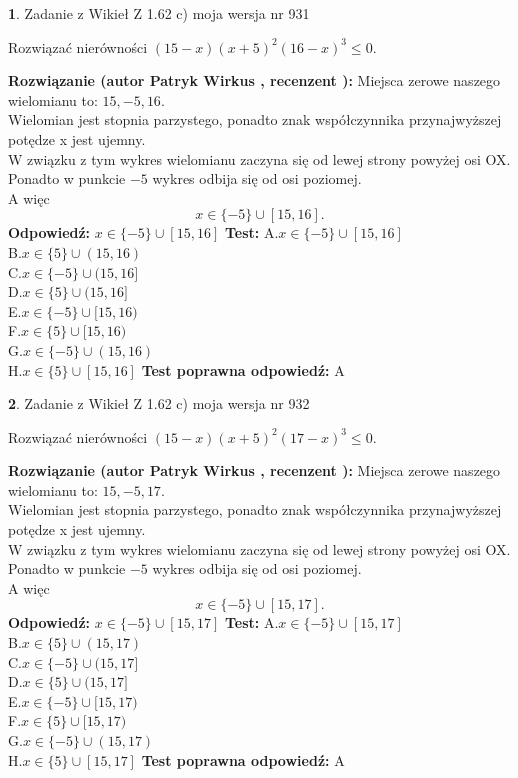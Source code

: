 \documentclass[12pt, a4paper]{article}
\theoremstyle{definition} %
\newtheorem{zad}{}
\newcommand{\zadStart}[1]{\begin{zad}#1\newline}
\newcommand{\zadStop}{\end{zad}}
\newcommand{\rozwStart}[2]{\noindent \textbf{Rozwiązanie (autor #1 , recenzent #2): }\newline}
\newcommand{\rozwStop}{\newline}
\newcommand{\odpStart}{\noindent \textbf{Odpowiedź:}\newline}
\newcommand{\odpStop}{\newline}
\newcommand{\testStart}{\noindent \textbf{Test:}\newline}
\newcommand{\testStop}{\newline}
\newcommand{\kluczStart}{\noindent \textbf{Test poprawna odpowiedź:}\newline}
\newcommand{\kluczStop}{\newline}
\begin{document}
\zadStart{Zadanie z Wikieł Z 1.62 c) moja wersja nr 931}

Rozwiązać nierówności $(15-x)(x+5)^{2}(16-x)^{3}\le0$.
\zadStop
\rozwStart{Patryk Wirkus}{}
Miejsca zerowe naszego wielomianu to: $15, -5, 16$.\\
Wielomian jest stopnia parzystego, ponadto znak współczynnika przy\linebreak najwyższej potędze x jest ujemny.\\ W związku z tym wykres wielomianu zaczyna się od lewej strony powyżej osi OX.\\
Ponadto w punkcie $-5$ wykres odbija się od osi poziomej.\\
A więc $$x \in \{-5\} \cup [15,16].$$
\rozwStop
\odpStart
$x \in \{-5\} \cup [15,16]$
\odpStop
\testStart
A.$x \in \{-5\} \cup [15,16]$\\
B.$x \in \{5\} \cup (15,16)$\\
C.$x \in \{-5\} \cup (15,16]$\\
D.$x \in \{5\} \cup (15,16]$\\
E.$x \in \{-5\} \cup [15,16)$\\
F.$x \in \{5\} \cup [15,16)$\\
G.$x \in \{-5\} \cup (15,16)$\\
H.$x \in \{5\} \cup [15,16]$
\testStop
\kluczStart
A
\kluczStop



\zadStart{Zadanie z Wikieł Z 1.62 c) moja wersja nr 932}

Rozwiązać nierówności $(15-x)(x+5)^{2}(17-x)^{3}\le0$.
\zadStop
\rozwStart{Patryk Wirkus}{}
Miejsca zerowe naszego wielomianu to: $15, -5, 17$.\\
Wielomian jest stopnia parzystego, ponadto znak współczynnika przy\linebreak najwyższej potędze x jest ujemny.\\ W związku z tym wykres wielomianu zaczyna się od lewej strony powyżej osi OX.\\
Ponadto w punkcie $-5$ wykres odbija się od osi poziomej.\\
A więc $$x \in \{-5\} \cup [15,17].$$
\rozwStop
\odpStart
$x \in \{-5\} \cup [15,17]$
\odpStop
\testStart
A.$x \in \{-5\} \cup [15,17]$\\
B.$x \in \{5\} \cup (15,17)$\\
C.$x \in \{-5\} \cup (15,17]$\\
D.$x \in \{5\} \cup (15,17]$\\
E.$x \in \{-5\} \cup [15,17)$\\
F.$x \in \{5\} \cup [15,17)$\\
G.$x \in \{-5\} \cup (15,17)$\\
H.$x \in \{5\} \cup [15,17]$
\testStop
\kluczStart
A
\kluczStop
\end{document}
